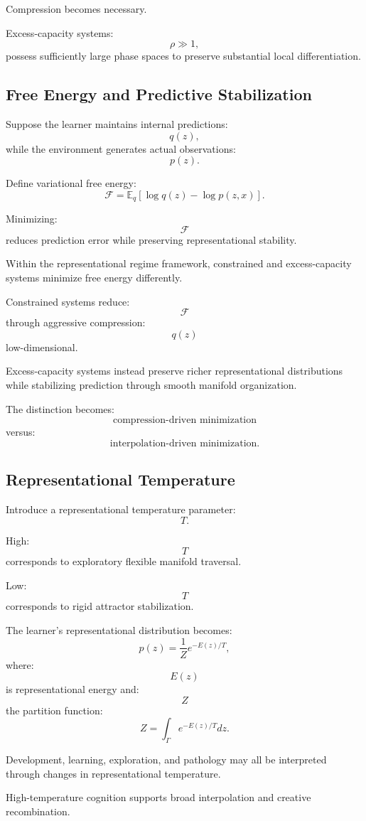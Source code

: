 \documentclass[12pt,a4paper]{article}
\begin{document}
Compression becomes necessary.

Excess-capacity systems:
\[
\rho
\gg
1,
\]
possess sufficiently large phase spaces to preserve substantial local differentiation.

\subsection{Free Energy and Predictive Stabilization}

Suppose the learner maintains internal predictions:
\[
q(z),
\]
while the environment generates actual observations:
\[
p(z).
\]

Define variational free energy:
\[
\mathcal{F}
=
\mathbb{E}_q[\log q(z)-\log p(z,x)].
\]

Minimizing:
\[
\mathcal{F}
\]
reduces prediction error while preserving representational stability.

Within the representational regime framework, constrained and excess-capacity systems minimize free energy differently.

Constrained systems reduce:
\[
\mathcal{F}
\]
through aggressive compression:
\[
q(z)
\]
low-dimensional.

Excess-capacity systems instead preserve richer representational distributions while stabilizing prediction through smooth manifold organization.

The distinction becomes:
\[
\text{compression-driven minimization}
\]
versus:
\[
\text{interpolation-driven minimization}.
\]

\subsection{Representational Temperature}

Introduce a representational temperature parameter:
\[
T.
\]

High:
\[
T
\]
corresponds to exploratory flexible manifold traversal.

Low:
\[
T
\]
corresponds to rigid attractor stabilization.

The learner's representational distribution becomes:
\[
p(z)
=
\frac{1}{Z}
e^{-E(z)/T},
\]
where:
\[
E(z)
\]
is representational energy and:
\[
Z
\]
the partition function:
\[
Z
=
\int_\Gamma
e^{-E(z)/T}
dz.
\]

Development, learning, exploration, and pathology may all be interpreted through changes in representational temperature.

High-temperature cognition supports broad interpolation and creative recombination.
\end{document}
